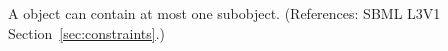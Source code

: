 A \Constraint object can contain at most one \Message subobject.
(References: SBML L3V1 Section~\ref{sec:constraints}.)

